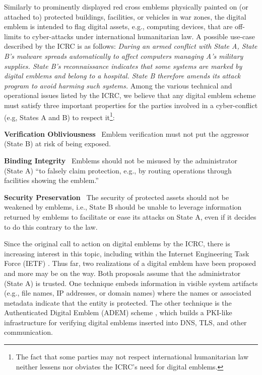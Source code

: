 \documentclass[letterpaper,twocolumn,10pt]{article}
\begin{document}
Similarly to prominently displayed red cross emblems physically painted on (or attached to)
protected buildings, facilities, or vehicles in war zones, the digital emblem is intended
to flag digital assets, e.g., computing devices, that are off-limits to cyber-attacks under
international humanitarian law. A possible use-case \cite{icrc} described by the ICRC is as follows:
%
    \textit{During an armed conflict with State A, State B's malware spreads automatically to affect computers
    managing A's military supplies. State B's reconnaissance indicates that some systems are marked by
    digital emblems and belong to a hospital. State B therefore amends its attack program to avoid harming such systems.}
%
Among the various technical and operational issues listed by the ICRC, we believe that any digital emblem scheme must satisfy
three important properties for the parties involved in a cyber-conflict (e.g, States A and B) to
respect it\footnote{The fact that some parties may not respect international humanitarian law neither
lessens nor obviates the ICRC's need for digital emblems.}:
%
\begin{compactitem}
\item\textbf{Verification Obliviousness}~ Emblem verification must not put the aggressor (State B)
at risk of being exposed.
\item\textbf{Binding Integrity}~ Emblems should not be misused by the administrator (State A) ``to falsely
claim protection, e.g., by routing operations through facilities showing the emblem.'' \cite{icrc}
\item\textbf{Security Preservation}~ The security of protected assets should not be weakened by emblems,
i.e., State B should be unable to leverage information returned by emblems
to facilitate or ease its attacks on State A, even if it decides to do this contrary to the law.
\end{compactitem}

Since the original call to action on digital emblems by the ICRC, there is increasing interest in this topic,
including within the Internet Engineering Task Force (IETF) \cite{linker-digital-emblem-01}.
Thus far, two realizations of a digital emblem \cite{icrc,adem} have been proposed and more may be on the way.
Both proposals assume that the administrator (State A) is trusted.
One technique embeds information in visible system artifacts \cite{icrc} (e.g., file names, IP addresses, or
domain names) where the names or associated metadata indicate that the entity is protected.
The other technique is the Authenticated Digital Emblem (ADEM) scheme \cite{adem}, which builds a
PKI-like infrastructure for verifying digital emblems inserted into DNS, TLS, and other communication.
\end{document}
